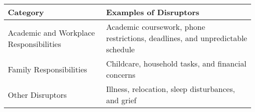\begin{table}[h!]
\centering
\caption{}
\label{tab:sed_summary}
\begin{renv}
    
\begin{tabular}{|p{4cm}|p{9cm}|}
\hline
\textbf{Category}                     & \textbf{Examples of Disruptors}                                                                                     \\ \hline
Academic and Workplace Responsibilities & Academic coursework,  phone restrictions, deadlines, and unpredictable schedule                         \\ \hline
Family Responsibilities                & Childcare, household tasks, and financial concerns                                   \\ \hline
Other Disruptors                      & Illness, relocation, sleep disturbances, and grief                                       \\ \hline
\end{tabular}
\end{renv}

\end{table}
